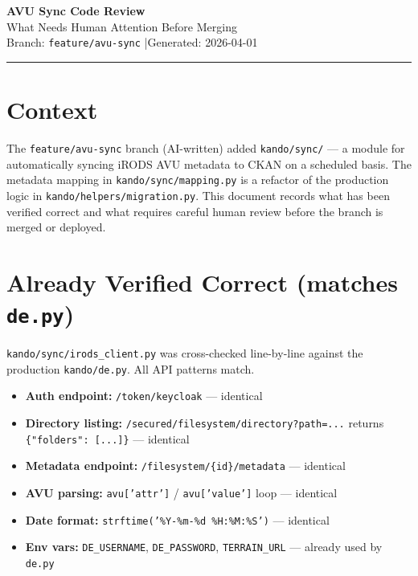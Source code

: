 \documentclass[11pt, a4paper]{article}
\begin{document}
\begin{center}
    {\LARGE\bfseries AVU Sync Code Review}\\[4pt]
    {\large What Needs Human Attention Before Merging}\\[8pt]
    {\small Branch: \texttt{feature/avu-sync} \quad|\quad Generated: 2026-04-01}
\end{center}

\vspace{4pt}
\hrule
\vspace{12pt}

\section{Context}

The \texttt{feature/avu-sync} branch (AI-written) added \texttt{kando/sync/} --- a module for
automatically syncing iRODS AVU metadata to CKAN on a scheduled basis. The metadata mapping in
\texttt{kando/sync/mapping.py} is a refactor of the production logic in
\texttt{kando/helpers/migration.py}. This document records what has been verified correct and
what requires careful human review before the branch is merged or deployed.

\section{Already Verified Correct (matches \texttt{de.py})}

\begin{okbox}
\texttt{kando/sync/irods\_client.py} was cross-checked line-by-line against the production
\texttt{kando/de.py}. All API patterns match.
\end{okbox}

\vspace{6pt}

\begin{itemize}[nosep, leftmargin=1.5em]
    \item \textbf{Auth endpoint:} \texttt{/token/keycloak} --- identical
    \item \textbf{Directory listing:} \texttt{/secured/filesystem/directory?path=...} returns \texttt{\{"folders": [...]\}} --- identical
    \item \textbf{Metadata endpoint:} \texttt{/filesystem/\{id\}/metadata} --- identical
    \item \textbf{AVU parsing:} \texttt{avu['attr']} / \texttt{avu['value']} loop --- identical
    \item \textbf{Date format:} \texttt{strftime('\%Y-\%m-\%d \%H:\%M:\%S')} --- identical
    \item \textbf{Env vars:} \texttt{DE\_USERNAME}, \texttt{DE\_PASSWORD}, \texttt{TERRAIN\_URL} --- already used by \texttt{de.py}
\end{itemize}
\end{document}
